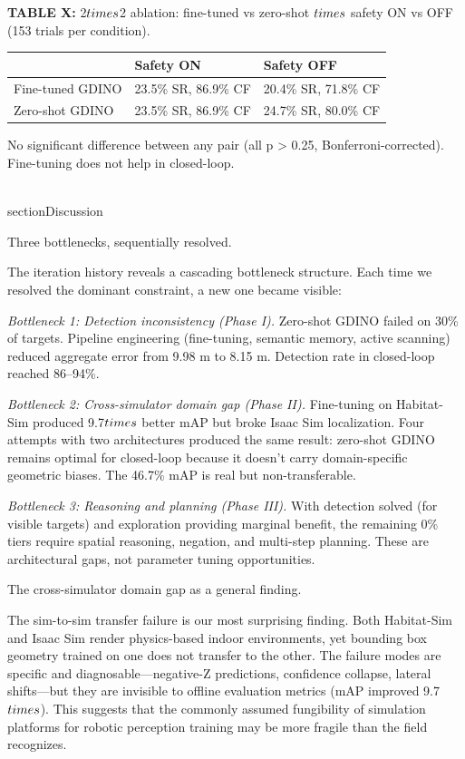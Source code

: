 \documentclass[conference]{IEEEtran}
\begin{document}
\textbf{TABLE X:} 2$\\times$2 ablation: fine-tuned vs zero-shot $\\times$ safety ON vs
OFF (153 trials per condition).

{\def\LTcaptype{none} %
\begin{longtable}[]{@{}lll@{}}
\toprule\noalign{}
& Safety ON & Safety OFF \\
\midrule\noalign{}
\endhead
\bottomrule\noalign{}
\endlastfoot
Fine-tuned GDINO & 23.5\% SR, 86.9\% CF & 20.4\% SR, 71.8\% CF \\
Zero-shot GDINO & 23.5\% SR, 86.9\% CF & 24.7\% SR, 80.0\% CF \\
\end{longtable}
}

No significant difference between any pair (all p \textgreater{} 0.25,
Bonferroni-corrected). Fine-tuning does not help in closed-loop.

\\section{Discussion}\label{viii.-discussion}

Three bottlenecks, sequentially resolved.

The iteration history reveals a cascading bottleneck structure. Each
time we resolved the dominant constraint, a new one became visible:

\emph{Bottleneck 1: Detection inconsistency (Phase I).} Zero-shot GDINO
failed on 30\% of targets. Pipeline engineering (fine-tuning, semantic
memory, active scanning) reduced aggregate error from 9.98 m to 8.15 m.
Detection rate in closed-loop reached 86--94\%.

\emph{Bottleneck 2: Cross-simulator domain gap (Phase II).} Fine-tuning
on Habitat-Sim produced 9.7$\\times$ better mAP but broke Isaac Sim
localization. Four attempts with two architectures produced the same
result: zero-shot GDINO remains optimal for closed-loop because it
doesn't carry domain-specific geometric biases. The 46.7\% mAP is real
but non-transferable.

\emph{Bottleneck 3: Reasoning and planning (Phase III).} With detection
solved (for visible targets) and exploration providing marginal benefit,
the remaining 0\% tiers require spatial reasoning, negation, and
multi-step planning. These are architectural gaps, not parameter tuning
opportunities.

The cross-simulator domain gap as a general finding.

The sim-to-sim transfer failure is our most surprising finding. Both
Habitat-Sim and Isaac Sim render physics-based indoor environments, yet
bounding box geometry trained on one does not transfer to the other. The
failure modes are specific and diagnosable---negative-Z predictions,
confidence collapse, lateral shifts---but they are invisible to offline
evaluation metrics (mAP improved 9.7$\\times$). This suggests that the commonly
assumed fungibility of simulation platforms for robotic perception
training may be more fragile than the field recognizes.
\end{document}

